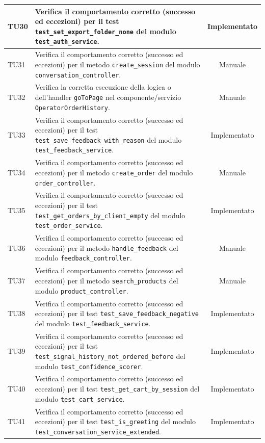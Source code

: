 \documentclass[a4paper,11pt,oneside]{scrartcl}
\begin{document}
\begin{longtable}{|p{1.9cm}|p{11.6cm}|c|}
    TU30 & Verifica il comportamento corretto (successo ed eccezioni) per il test \texttt{test\_set\_export\_folder\_none} del modulo \texttt{test\_auth\_service}. & Implementato \\ \hline
    TU31 & Verifica il comportamento corretto (successo ed eccezioni) per il metodo \texttt{create\_session} del modulo \texttt{conversation\_controller}. & Manuale \\ \hline
    TU32 & Verifica la corretta esecuzione della logica o dell'handler \texttt{goToPage} nel componente/servizio \texttt{OperatorOrderHistory}. & Manuale \\ \hline
    TU33 & Verifica il comportamento corretto (successo ed eccezioni) per il test \texttt{test\_save\_feedback\_with\_reason} del modulo \texttt{test\_feedback\_service}. & Implementato \\ \hline
    TU34 & Verifica il comportamento corretto (successo ed eccezioni) per il metodo \texttt{create\_order} del modulo \texttt{order\_controller}. & Manuale \\ \hline
    TU35 & Verifica il comportamento corretto (successo ed eccezioni) per il test \texttt{test\_get\_orders\_by\_client\_empty} del modulo \texttt{test\_order\_service}. & Implementato \\ \hline
    TU36 & Verifica il comportamento corretto (successo ed eccezioni) per il metodo \texttt{handle\_feedback} del modulo \texttt{feedback\_controller}. & Manuale \\ \hline
    TU37 & Verifica il comportamento corretto (successo ed eccezioni) per il metodo \texttt{search\_products} del modulo \texttt{product\_controller}. & Manuale \\ \hline
    TU38 & Verifica il comportamento corretto (successo ed eccezioni) per il test \texttt{test\_save\_feedback\_negative} del modulo \texttt{test\_feedback\_service}. & Implementato \\ \hline
    TU39 & Verifica il comportamento corretto (successo ed eccezioni) per il test \texttt{test\_signal\_history\_not\_ordered\_before} del modulo \texttt{test\_confidence\_scorer}. & Implementato \\ \hline
    TU40 & Verifica il comportamento corretto (successo ed eccezioni) per il test \texttt{test\_get\_cart\_by\_session} del modulo \texttt{test\_cart\_service}. & Implementato \\ \hline
    TU41 & Verifica il comportamento corretto (successo ed eccezioni) per il test \texttt{test\_is\_greeting} del modulo \texttt{test\_conversation\_service\_extended}. & Implementato \\ \hline

\end{longtable}
\end{document}
